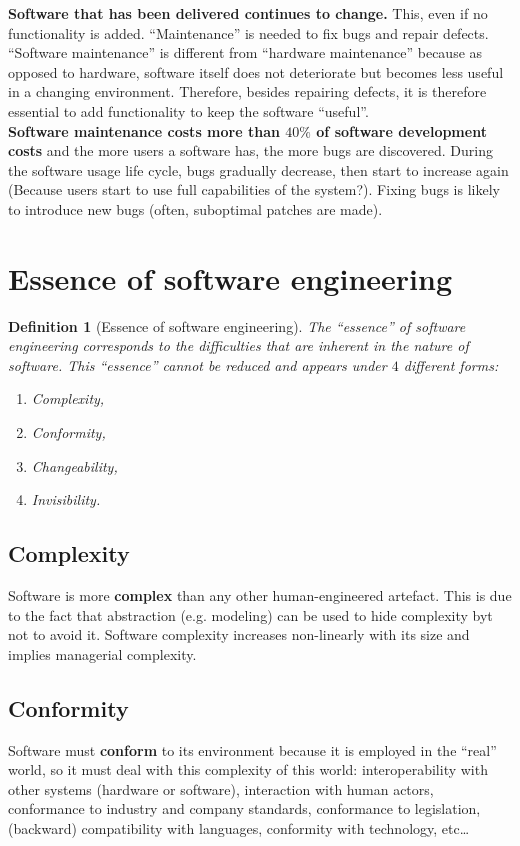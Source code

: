 \documentclass[a4paper,11pt]{report}
\newtheorem{definition}{Definition}
\begin{document}
\textbf{Software that has been delivered continues to change.} This, even if no
functionality is added. ``Maintenance'' is needed to fix bugs and repair
defects. ``Software maintenance'' is different from ``hardware maintenance''
because as opposed to hardware, software itself does not deteriorate but becomes
less useful in a changing environment. Therefore, besides repairing defects, it
is therefore essential to add functionality to keep the software ``useful''.\\

\textbf{Software maintenance costs more than $40\%$ of software development
costs} and the more users a software has, the more bugs are discovered. During
the software usage life cycle, bugs gradually decrease, then start to increase
again (Because users start to use full capabilities of the system?). Fixing bugs
is likely to introduce new bugs (often, suboptimal patches are made).

\clearpage
\section{Essence of software engineering}

\begin{definition}[Essence of software engineering]
The ``essence'' of software engineering corresponds to the difficulties that are
inherent in the nature of software. This ``essence'' cannot be reduced and
appears under $4$ different forms:
\begin{enumerate}
\item Complexity,
\item Conformity,
\item Changeability,
\item Invisibility.
\end{enumerate}
\end{definition}

\subsection{Complexity}
Software is more \textbf{complex} than any other human-engineered artefact.
This is due to the fact that abstraction (e.g. modeling) can be used to hide
complexity byt not to avoid it. Software complexity increases non-linearly with
its size and implies managerial complexity.

\subsection{Conformity}
Software must \textbf{conform} to its environment because it is employed in the
``real'' world, so it must deal with this complexity of this world:
interoperability with other systems (hardware or software), interaction with
human actors, conformance to industry and company standards, conformance to
legislation, (backward) compatibility with languages, conformity with
technology, etc\dots
\end{document}
